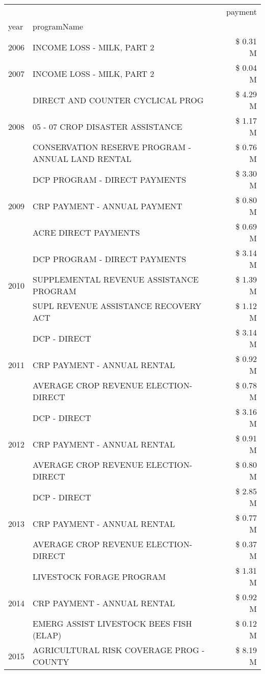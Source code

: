 \begin{tabular}{llr}
\toprule
 &  & payment \\
year & programName &  \\
\midrule
2006 & INCOME LOSS - MILK, PART 2 & \$ 0.31 M \\
\cline{1-3}
2007 & INCOME LOSS - MILK, PART 2 & \$ 0.04 M \\
\cline{1-3}
\multirow[t]{3}{*}{2008} & DIRECT AND COUNTER CYCLICAL PROG & \$ 4.29 M \\
 & 05 - 07 CROP DISASTER ASSISTANCE & \$ 1.17 M \\
 & CONSERVATION RESERVE PROGRAM - ANNUAL LAND RENTAL & \$ 0.76 M \\
\cline{1-3}
\multirow[t]{3}{*}{2009} & DCP PROGRAM - DIRECT PAYMENTS & \$ 3.30 M \\
 & CRP PAYMENT - ANNUAL PAYMENT & \$ 0.80 M \\
 & ACRE DIRECT PAYMENTS & \$ 0.69 M \\
\cline{1-3}
\multirow[t]{3}{*}{2010} & DCP PROGRAM - DIRECT PAYMENTS & \$ 3.14 M \\
 & SUPPLEMENTAL REVENUE ASSISTANCE PROGRAM & \$ 1.39 M \\
 & SUPL REVENUE ASSISTANCE RECOVERY ACT & \$ 1.12 M \\
\cline{1-3}
\multirow[t]{3}{*}{2011} & DCP - DIRECT & \$ 3.14 M \\
 & CRP PAYMENT - ANNUAL RENTAL & \$ 0.92 M \\
 & AVERAGE CROP REVENUE ELECTION-DIRECT & \$ 0.78 M \\
\cline{1-3}
\multirow[t]{3}{*}{2012} & DCP - DIRECT & \$ 3.16 M \\
 & CRP PAYMENT - ANNUAL RENTAL & \$ 0.91 M \\
 & AVERAGE CROP REVENUE ELECTION-DIRECT & \$ 0.80 M \\
\cline{1-3}
\multirow[t]{3}{*}{2013} & DCP - DIRECT & \$ 2.85 M \\
 & CRP PAYMENT - ANNUAL RENTAL & \$ 0.77 M \\
 & AVERAGE CROP REVENUE ELECTION-DIRECT & \$ 0.37 M \\
\cline{1-3}
\multirow[t]{3}{*}{2014} & LIVESTOCK FORAGE PROGRAM & \$ 1.31 M \\
 & CRP PAYMENT - ANNUAL RENTAL & \$ 0.92 M \\
 & EMERG ASSIST LIVESTOCK BEES FISH (ELAP) & \$ 0.12 M \\
\cline{1-3}
\multirow[t]{3}{*}{2015} & AGRICULTURAL RISK COVERAGE PROG - COUNTY & \$ 8.19 M \\

\end{tabular}

